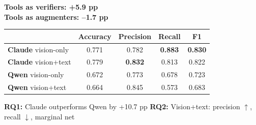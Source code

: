 \documentclass[border=8pt]{standalone}
\begin{document}
\begin{minipage}{16cm}

\begin{center}
{\bfseries\LARGE\textcolor{dgreen}{Tools as verifiers: +5.9 pp}}\\[4pt]
{\bfseries\LARGE\textcolor{dred}{Tools as augmenters: --1.7 pp}}
\end{center}

\vspace{8pt}

\begin{tcolorbox}[colback=dblue!5, colframe=dblue, arc=6pt,
  title={\large\bfseries Baseline Results (RQ1/RQ2)},
  fonttitle=\color{white}, coltitle=white, colbacktitle=dblue]
\centering
\renewcommand{\arraystretch}{1.3}
\begin{tabular}{lcccc}
\toprule
& \textbf{Accuracy} & \textbf{Precision} & \textbf{Recall} & \textbf{F1} \\
\midrule
\textbf{Claude} vision-only & 0.771 & 0.782 & \textbf{0.883} & \textbf{0.830} \\
\textbf{Claude} vision+text & 0.779 & \textbf{0.832} & 0.813 & 0.822 \\
\textbf{Qwen} vision-only & 0.672 & 0.773 & 0.678 & 0.723 \\
\textbf{Qwen} vision+text & 0.664 & 0.845 & 0.573 & 0.683 \\
\bottomrule
\end{tabular}

\vspace{6pt}
\textcolor{dgreen}{\textbf{RQ1:}} Claude outperforms Qwen by +10.7 pp \quad
\textcolor{dblue}{\textbf{RQ2:}} Vision+text: precision $\uparrow$, recall $\downarrow$, marginal net
\end{tcolorbox}

\vspace{8pt}


\end{minipage}
\end{document}
